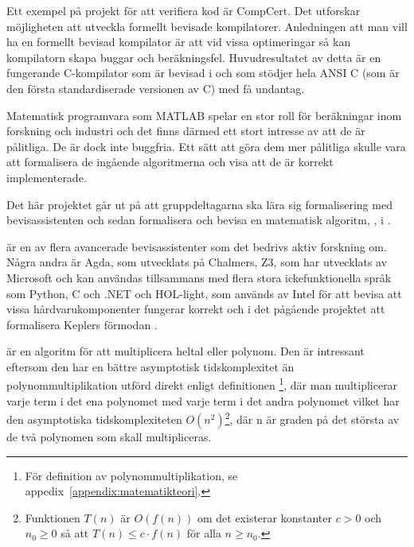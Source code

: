 Ett exempel på projekt för att verifiera kod är CompCert. Det utforskar
möjligheten att utveckla formellt bevisade kompilatorer. Anledningen att man
vill ha en formellt bevisad kompilator är att vid vissa optimeringar så kan
kompilatorn skapa buggar och beräkningsfel. Huvudresultatet av detta är en
fungerande C-kompilator som är bevisad i \coq och som stödjer hela ANSI C (som
är den första standardiserade versionen av C) med få
undantag\autocite{compcert}.

Matematisk programvara som MATLAB spelar en stor roll för beräkningar inom
forskning och industri och det finns därmed ett stort intresse av att de är
pålitliga. De är dock inte buggfria. Ett sätt att göra dem mer pålitliga skulle
vara att formalisera de ingående algoritmerna och visa att de är korrekt
implementerade\cite{denes2012refinement}.

Det här projektet går ut på att gruppdeltagarna ska lära sig formalisering med
bevisassistenten \coq och sedan formalisera och bevisa en matematisk algoritm,
\toom, i \coq.

\coq är en av flera avancerade bevisassistenter som det bedrivs aktiv forskning
om. Några andra är Agda, som utvecklats på Chalmers, Z3, som har utvecklats av
Microsoft och kan användas tillsammans med flera stora ickefunktionella språk
som Python, C och .NET och HOL-light, som används av Intel för att bevisa att
vissa hårdvarukomponenter fungerar korrekt och i det pågående projektet att
formalisera Keplers förmodan \cite{hales2008formal}.

\toom är en algoritm för att multiplicera heltal eller polynom. Den är
intressant eftersom den har en bättre asymptotisk tidskomplexitet än
polynommultiplikation utförd direkt enligt definitionen \footnote{För
definition av polynommultiplikation, se
appedix~\ref{appendix:matematikteori}.}, där man multiplicerar varje term i det
ena polynomet med varje term i det andra polynomet vilket har den asymptotiska
tidskomplexiteten $O\left(n^2\right)$\footnote{Funktionen $T(n)$ är $O(f(n))$
om det existerar konstanter $c > 0$ och $n_0 \geq 0$ så att $T(n) \leq c \cdot
f(n)$ för alla $n \geq n_0$.}, där n är graden på det största av de två
polynomen som skall multipliceras.